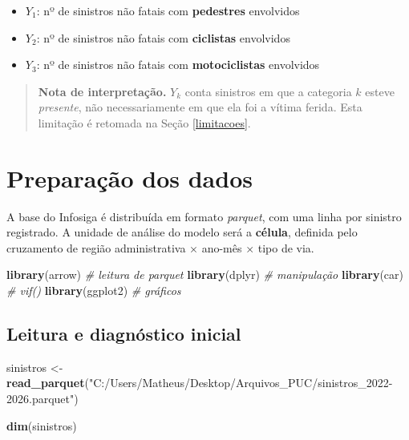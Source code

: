 \documentclass[
  11pt,
]{article}
\newenvironment{Shaded}{\begin{snugshade}}{\end{snugshade}}
\newcommand{\CommentTok}[1]{\textcolor[rgb]{0.56,0.35,0.01}{\textit{#1}}}
\newcommand{\FunctionTok}[1]{\textcolor[rgb]{0.13,0.29,0.53}{\textbf{#1}}}
\newcommand{\NormalTok}[1]{#1}
\newcommand{\OtherTok}[1]{\textcolor[rgb]{0.56,0.35,0.01}{#1}}
\newcommand{\StringTok}[1]{\textcolor[rgb]{0.31,0.60,0.02}{#1}}
\providecommand{\tightlist}{%
  \setlength{\itemsep}{0pt}\setlength{\parskip}{0pt}}
\begin{document}
\begin{itemize}
\tightlist
\item
  \(Y_1\): nº de sinistros não fatais com \textbf{pedestres} envolvidos
\item
  \(Y_2\): nº de sinistros não fatais com \textbf{ciclistas} envolvidos
\item
  \(Y_3\): nº de sinistros não fatais com \textbf{motociclistas}
  envolvidos
\end{itemize}

\begin{quote}
\textbf{Nota de interpretação.} \(Y_k\) conta sinistros em que a
categoria \(k\) esteve \emph{presente}, não necessariamente em que ela
foi a vítima ferida. Esta limitação é retomada na Seção
\ref{limitacoes}.
\end{quote}

\newpage

\section{Preparação dos dados}\label{preparauxe7uxe3o-dos-dados}

A base do Infosiga é distribuída em formato \emph{parquet}, com uma
linha por sinistro registrado. A unidade de análise do modelo será a
\textbf{célula}, definida pelo cruzamento de região administrativa
\(\times\) ano-mês \(\times\) tipo de via.

\begin{Shaded}
\begin{Highlighting}[]
\FunctionTok{library}\NormalTok{(arrow)     }\CommentTok{\# leitura de parquet}
\FunctionTok{library}\NormalTok{(dplyr)     }\CommentTok{\# manipulação}
\FunctionTok{library}\NormalTok{(car)       }\CommentTok{\# vif()}
\FunctionTok{library}\NormalTok{(ggplot2)   }\CommentTok{\# gráficos}
\end{Highlighting}
\end{Shaded}

\subsection{Leitura e diagnóstico
inicial}\label{leitura-e-diagnuxf3stico-inicial}

\begin{Shaded}
\begin{Highlighting}[]
\NormalTok{sinistros }\OtherTok{\textless{}{-}} \FunctionTok{read\_parquet}\NormalTok{(}\StringTok{"C:/Users/Matheus/Desktop/Arquivos\_PUC/sinistros\_2022{-}2026.parquet"}\NormalTok{)}

\FunctionTok{dim}\NormalTok{(sinistros)}
\end{Highlighting}
\end{Shaded}
\end{document}

